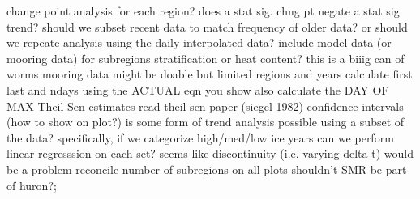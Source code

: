 \markdownRendererDocumentBegin
\markdownRendererUlBegin
\markdownRendererUlItem change point analysis for each region?\markdownRendererInterblockSeparator
{}\markdownRendererUlBeginTight
\markdownRendererUlItem does a stat sig. chng pt negate a stat sig trend?\markdownRendererUlItemEnd 
\markdownRendererUlEndTight \markdownRendererUlItemEnd 
\markdownRendererUlItem should we subset recent data to match frequency of older data? or should we repeate analysis using the daily interpolated data?\markdownRendererUlItemEnd 
\markdownRendererUlItem include model data (or mooring data) for subregions stratification or heat content? this is a biiig can of worms\markdownRendererUlItemEnd 
\markdownRendererUlItem mooring data might be doable but limited regions and years\markdownRendererUlItemEnd 
\markdownRendererUlItem calculate first last and ndays using the ACTUAL eqn you show\markdownRendererUlItemEnd 
\markdownRendererUlItem also calculate the DAY OF MAX\markdownRendererUlItemEnd 
\markdownRendererUlItem Theil-Sen estimates\markdownRendererUlItemEnd 
\markdownRendererUlItem read theil-sen paper (siegel 1982)\markdownRendererUlItemEnd 
\markdownRendererUlItem confidence intervals (how to show on plot?)\markdownRendererUlItemEnd 
\markdownRendererUlItem is some form of trend analysis possible using a subset of the data?\markdownRendererInterblockSeparator
{}\markdownRendererUlBeginTight
\markdownRendererUlItem specifically, if we categorize high/med/low ice years can we perform linear regresssion on each set?\markdownRendererUlItemEnd 
\markdownRendererUlItem seems like discontinuity (i.e. varying delta t) would be a problem\markdownRendererUlItemEnd 
\markdownRendererUlEndTight \markdownRendererUlItemEnd 
\markdownRendererUlItem reconcile number of subregions on all plots\markdownRendererInterblockSeparator
{}\markdownRendererUlBeginTight
\markdownRendererUlItem shouldn't SMR be part of huron?;\markdownRendererUlItemEnd 
\markdownRendererUlEndTight \markdownRendererUlItemEnd 
\markdownRendererUlEnd \markdownRendererDocumentEnd